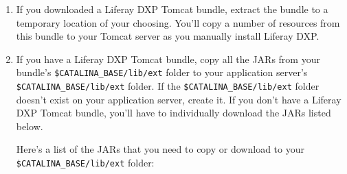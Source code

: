 \begin{enumerate}
\def\labelenumi{\arabic{enumi}.}
\item
  If you downloaded a Liferay DXP Tomcat bundle, extract the bundle to a
  temporary location of your choosing. You'll copy a number of resources
  from this bundle to your Tomcat server as you manually install Liferay
  DXP.
\item
  If you have a Liferay DXP Tomcat bundle, copy all the JARs from your
  bundle's \texttt{\$CATALINA\_BASE/lib/ext} folder to your application
  server's \texttt{\$CATALINA\_BASE/lib/ext} folder. If the
  \texttt{\$CATALINA\_BASE/lib/ext} folder doesn't exist on your
  application server, create it. If you don't have a Liferay DXP Tomcat
  bundle, you'll have to individually download the JARs listed below.

  Here's a list of the JARs that you need to copy or download to your
  \texttt{\$CATALINA\_BASE/lib/ext} folder:


\end{enumerate}
